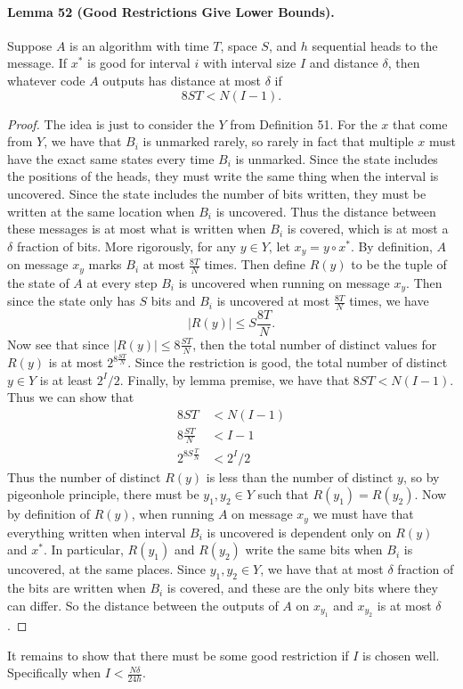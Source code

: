 \paragraph{Lemma 52 (Good Restrictions Give Lower Bounds).} Suppose $A$ is an algorithm with time $T$, space $S$, and $h$ sequential heads to the message. If $x^*$ is good for interval $i$ with interval size $I$ and distance $\delta$, then whatever code $A$ outputs has distance at most $\delta$ if
\[8ST<N(I-1).\]
\begin{proof}
The idea is just to consider the $Y$ from Definition 51. For the $x$ that come from $Y$, we have that $B_i$ is unmarked rarely, so rarely in fact that multiple $x$ must have the exact same states every time $B_i$ is unmarked. Since the state includes the positions of the heads, they must write the same thing when the interval is uncovered. Since the state includes the number of bits written, they must be written at the same location when $B_i$ is uncovered. Thus the distance between these messages is at most what is written when $B_i$ is covered, which is at most a $\delta$ fraction of bits.
More rigorously, for any $y\in Y$, let $x_y=y\circ x^*$. By definition, $A$ on message $x_y$ marks $B_i$ at most $\frac{8T}N$ times. Then define $R(y)$ to be the tuple of the state of $A$ at every step $B_i$ is uncovered when running on message $x_y$. Then since the state only has $S$ bits and $B_i$ is uncovered at most $\frac{8T}N$ times, we have
\[|R(y)|\le S\frac{8T}N.\]
Now see that since $|R(y)|\le8\frac{ST}N$, then the total number of distinct values for $R(y)$ is at most $2^{8\frac{ST}N}$. Since the restriction is good, the total number of distinct $y\in Y$ is at least $2^I/2$. Finally, by lemma premise, we have that $8ST<N(I-1)$. Thus we can show that
\begin{align*}8ST&<N(I-1)\\8\frac{ST}N&<I-1\\2^{8S\frac TN}&<2^I/2\end{align*}
Thus the number of distinct $R(y)$ is less than the number of distinct $y$, so by pigeonhole principle, there must be $y_1,y_2\in Y$ such that $R(y_1)=R(y_2)$.
Now by definition of $R(y)$, when running $A$ on message $x_y$ we must have that everything written when interval $B_i$ is uncovered is dependent only on $R(y)$ and $x^*$. In particular, $R(y_1)$ and $R(y_2)$ write the same bits when $B_i$ is uncovered, at the same places.
Since $y_1,y_2\in Y$, we have that at most $\delta$ fraction of the bits are written when $B_i$ is covered, and these are the only bits where they can differ. So the distance between the outputs of $A$ on $x_{y_1}$ and $x_{y_2}$ is at most $\delta$.
\end{proof}
It remains to show that there must be some good restriction if $I$ is chosen well. Specifically when $I<\frac{N\delta}{24h}$.
